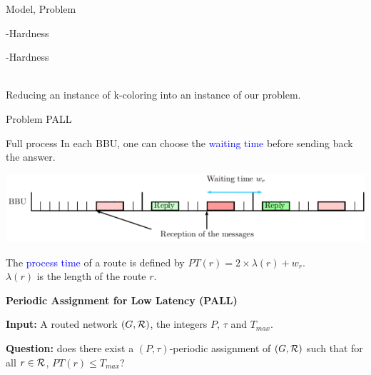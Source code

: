 \documentclass[10 pt]{beamer}
\begin{document}
\begin{section}{Model, Problem}
\begin{subsection}{\NP-Hardness}
\begin{frame}{\NP-Hardness}
\begin{center}
{


}\\
\vspace{2cm}
 Reducing an instance of k-coloring into an instance of our problem.
 
 \end{center}
\end{frame}
\end{subsection}

\begin{subsection}{Problem PALL}
\begin{frame}{Full process}
In each BBU, one can choose the \textcolor{blue}{waiting time} before sending back the answer.\\

\begin{center}
  \includegraphics[scale=0.7]{BBU}\\
 \end{center} 
 The \textcolor{blue}{process time} of a route is defined by $PT(r)=2\times\lambda(r)+ w_r$.\\
 
 $\lambda(r)$ is the length of the route $r$.
 
 \vspace{0.5cm}
 \pause
      {\bf Periodic Assignment for Low Latency (PALL)} 

      {\bf Input:}  A routed network $(G,{\cal R})$, the integers $P$, $\tau$ and $T_{max}$.

      {\bf Question:} does there exist a $(P,\tau)$-periodic assignment of $(G,{\cal R})$ such that for all $r \in {\cal R}$, $PT(r) \leq T_{max}$?
\end {frame}
\end{subsection}


\end{section}
\end{document}
